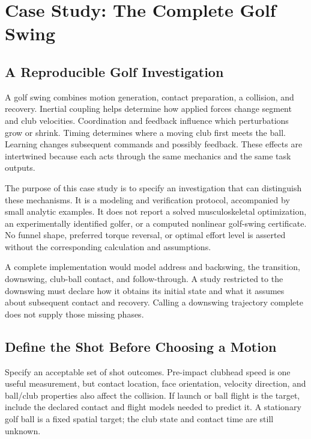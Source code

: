 \documentclass[12pt, openany]{book}
\theoremstyle{plain}
\begin{document}
\setcounter{chapter}{10}

\chapter{Case Study: The Complete Golf Swing}
\label{ch:case_study_golf_swing}
\begingroup
\raggedbottom
{}

\section{A Reproducible Golf Investigation}

A golf swing combines motion generation, contact preparation, a collision, and recovery. Inertial coupling helps determine how applied forces change segment and club velocities. Coordination and feedback influence which perturbations grow or shrink. Timing determines where a moving club first meets the ball. Learning changes subsequent commands and possibly feedback. These effects are intertwined because each acts through the same mechanics and the same task outputs.

The purpose of this case study is to specify an investigation that can distinguish these mechanisms. It is a modeling and verification protocol, accompanied by small analytic examples. It does not report a solved musculoskeletal optimization, an experimentally identified golfer, or a computed nonlinear golf-swing certificate. No funnel shape, preferred torque reversal, or optimal effort level is asserted without the corresponding calculation and assumptions.

A complete implementation would model address and backswing, the transition, downswing, club-ball contact, and follow-through. A study restricted to the downswing must declare how it obtains its initial state and what it assumes about subsequent contact and recovery. Calling a downswing trajectory complete does not supply those missing phases.

\section{Define the Shot Before Choosing a Motion}

Specify an acceptable set of shot outcomes. Pre-impact clubhead speed is one useful measurement, but contact location, face orientation, velocity direction, and ball/club properties also affect the collision. If launch or ball flight is the target, include the declared contact and flight models needed to predict it. A stationary golf ball is a fixed spatial target; the club state and contact time are still unknown.
\end{document}
